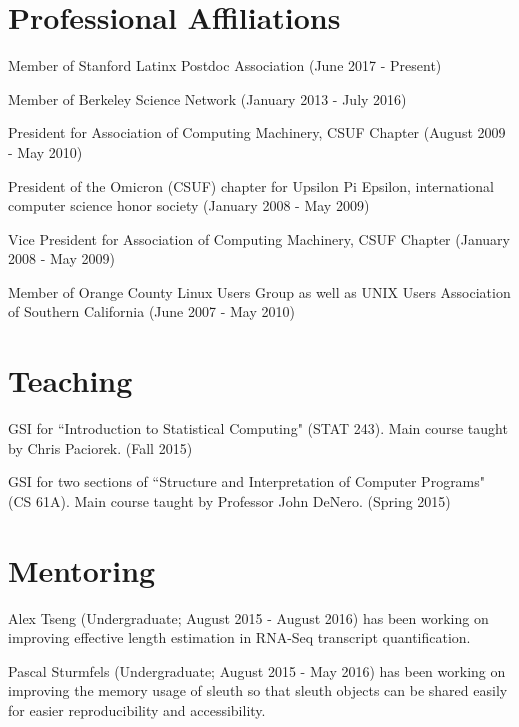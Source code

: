 \documentclass[overlapped]{res}
\begin{document}
\begin{resume}
\newpage

\section{\sc Professional Affiliations}
Member of Stanford Latinx Postdoc Association
(June 2017 - Present)

Member of Berkeley Science Network
(January 2013 - July 2016)

President for Association of Computing Machinery, CSUF Chapter
(August 2009 - May 2010)

President of the Omicron (CSUF) chapter for Upsilon Pi Epsilon,
international computer science honor society (January 2008 - May 2009)

Vice President for Association of Computing Machinery, CSUF Chapter
(January 2008 - May 2009)

Member of Orange County Linux Users Group as well as UNIX Users
Association of Southern California (June 2007 - May 2010)





\section{\sc Teaching}
GSI for ``Introduction to Statistical Computing" (STAT 243). Main course taught
by Chris Paciorek. (Fall 2015)

GSI for two sections of ``Structure and Interpretation of Computer Programs"
(CS 61A). Main course taught by Professor John DeNero. (Spring 2015)

\section{\sc Mentoring}
Alex Tseng (Undergraduate; August 2015 - August 2016) has been working on improving effective length estimation in RNA-Seq transcript quantification.

Pascal Sturmfels (Undergraduate; August 2015 - May 2016) has been working on improving the memory usage of sleuth so that sleuth objects can be shared easily for easier reproducibility and accessibility.


\end{resume}
\end{document}
